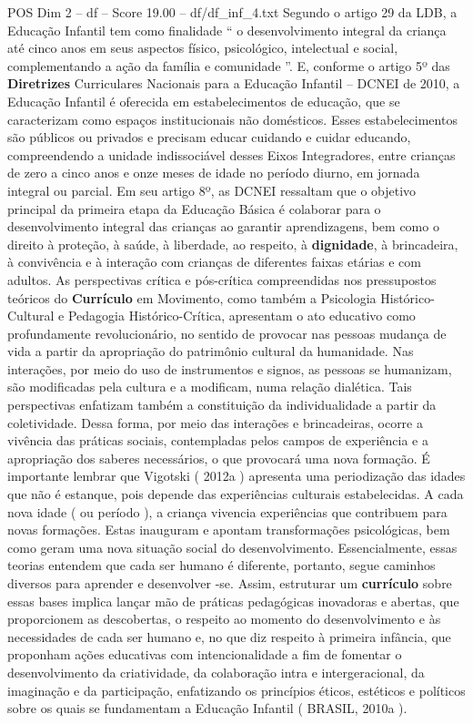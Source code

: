 \begin{textsample}{POS Dim 2 – df – Score 19.00 – df/df\_inf\_4.txt}
Segundo o artigo 29 da LDB, a Educação Infantil tem como finalidade “ o desenvolvimento integral da criança até cinco anos em seus aspectos físico, psicológico, intelectual e social, complementando a ação da família e comunidade ”.
E, conforme o artigo 5º das \textbf{Diretrizes} Curriculares Nacionais para a Educação Infantil – DCNEI de 2010, a Educação Infantil é oferecida em estabelecimentos de educação, que se caracterizam como espaços institucionais não domésticos.
Esses estabelecimentos são públicos ou privados e precisam educar cuidando e cuidar educando, compreendendo a unidade indissociável desses Eixos Integradores, entre crianças de zero a cinco anos e onze meses de idade no período diurno, em jornada integral ou parcial.
Em seu artigo 8º, as DCNEI ressaltam que o objetivo principal da primeira etapa da Educação Básica é colaborar para o desenvolvimento integral das crianças ao garantir aprendizagens, bem como o direito à proteção, à saúde, à liberdade, ao respeito, à \textbf{dignidade}, à brincadeira, à convivência e à interação com crianças de diferentes faixas etárias e com adultos.
As perspectivas crítica e pós-crítica compreendidas nos pressupostos teóricos do \textbf{Currículo} em Movimento, como também a Psicologia Histórico-Cultural e Pedagogia Histórico-Crítica, apresentam o ato educativo como profundamente revolucionário, no sentido de provocar nas pessoas mudança de vida a partir da apropriação do patrimônio cultural da humanidade.
Nas interações, por meio do uso de instrumentos e signos, as pessoas se humanizam, são modificadas pela cultura e a modificam, numa relação dialética.
Tais perspectivas enfatizam também a constituição da individualidade a partir da coletividade.
Dessa forma, por meio das interações e brincadeiras, ocorre a vivência das práticas sociais, contempladas pelos campos de experiência e a apropriação dos saberes necessários, o que provocará uma nova formação.
É importante lembrar que Vigotski ( 2012a ) apresenta uma periodização das idades que não é estanque, pois depende das experiências culturais estabelecidas.
A cada nova idade ( ou período ), a criança vivencia experiências que contribuem para novas formações.
Estas inauguram e apontam transformações psicológicas, bem como geram uma nova situação social do desenvolvimento.
Essencialmente, essas teorias entendem que cada ser humano é diferente, portanto, segue caminhos diversos para aprender e desenvolver -se.
Assim, estruturar um \textbf{currículo} sobre essas bases implica lançar mão de práticas pedagógicas inovadoras e abertas, que proporcionem as descobertas, o respeito ao momento do desenvolvimento e às necessidades de cada ser humano e, no que diz respeito à primeira infância, que proponham ações educativas com intencionalidade a fim de fomentar o desenvolvimento da criatividade, da colaboração intra e intergeracional, da imaginação e da participação, enfatizando os princípios éticos, estéticos e políticos sobre os quais se fundamentam a Educação Infantil ( BRASIL, 2010a ).

\end{textsample}
